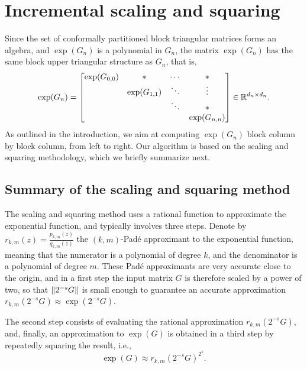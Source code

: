 \section{Incremental scaling and squaring}
\label{sec:scaling_and_squaring}

Since the set of conformally partitioned block triangular matrices
forms an algebra, and $\exp(G_n)$ is a polynomial in $G_n$, the matrix
$\exp(G_n)$ has the same block upper triangular structure as $G_n$, that is,
\begin{equation*}
    \exp(G_n) =
    \begin{bmatrix}
        \exp(G_{0,0}) & \ast          & \cdots & \ast \\
                      & \exp(G_{1,1}) & \ddots & \vdots \\
                      &               & \ddots & \ast  \\
                      &               &        & \exp(G_{n,n}) \\
    \end{bmatrix}
    \in {\mathbb R}^{d_n \times d_n}.
\end{equation*}
As outlined in the introduction, we aim at computing $\exp(G_n)$ block
column by block column, from left to right.  Our algorithm is based on
the scaling and squaring methodology, which we briefly summarize
next.

\subsection{Summary of the scaling and squaring method}
\label{sec:scaling_squaring}

The scaling and squaring method uses a rational function to
approximate the exponential function, and typically involves three
steps. Denote by $r_{k,m}(z) = \frac{p_{k,m}(z)}{q_{k,m}(z)}$ the
$(k,m)$-Pad\'e approximant to the exponential function, meaning that
the numerator is a polynomial of degree $k$, and the denominator is a
polynomial of degree $m$. These Pad\'e approximants are very accurate close
to the origin, and in a first step the input matrix $G$ is therefore scaled by a
power of two, so that $\lVert 2^{-s}G \rVert$ is small enough to guarantee an
accurate approximation $r_{k,m}(2^{-s}G) \approx \exp(2^{-s} G)$.

The second step consists of evaluating the rational approximation
$r_{k,m}(2^{-s}G)$, and, finally, an approximation
to $\exp(G)$ is obtained in a third step by repeatedly squaring the
result, i.e.,
\begin{equation*}
    \exp(G) \approx r_{k,m}(2^{-s}G)^{2^s}.
\end{equation*}

